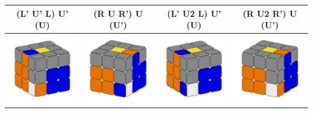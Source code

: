 \documentclass[12pt, a3paper]{article}
\newcommand{\scale}{1}
\begin{document}
\begin{center}
\begin{longtable}{c|c||c|c}
	(L' U' L) U' (U) & (R U R') U (U') & (L' U2 L) U' (U) & (R U2 R') U (U') \\
	\hline
	\hline
	\includegraphics[scale=\scale]{15_left} & \includegraphics[scale=\scale]{15_right}  &  \includegraphics[scale=\scale]{16_left} & \includegraphics[scale=\scale]{16_right} \\

\end{longtable}
\end{center}
\end{document}
